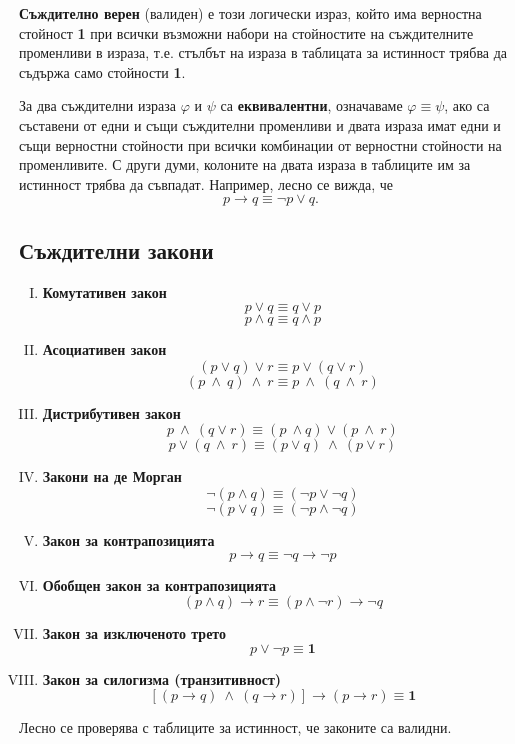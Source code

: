 {\bf Съждително верен} (валиден) е този логически израз, който има верностна стойност {\bf 1} при всички възможни набори на
стойностите на съждителните променливи в израза, т.е. стълбът на израза в таблицата за истинност трябва да съдържа само 
стойности {\bf 1}. 

За два съждителни израза $\varphi$ и $\psi$ са {\bf еквивалентни}, означаваме $\varphi \equiv \psi$, ако са съставени от 
едни и същи съждителни променливи и двата израза имат едни и същи верностни стойности при всички комбинации от верностни 
стойности на променливите. С други думи, колоните на двата израза в таблиците им за истинност трябва да съвпадат.
Например, лесно се вижда, че 
\[p\to q \equiv \neg p \vee q.\]

\subsection*{Съждителни закони}

\begin{enumerate}[I)]
  \item
    {\bf Комутативен закон}
    \[p\vee q \equiv q\vee p\] 
    \[p \wedge q \equiv q \wedge p\]
  \item
    {\bf Асоциативен закон}
    \[(p\vee q)\vee r \equiv p\vee(q\vee r)\]
    \[(p\ \wedge\ q)\ \wedge\ r \equiv p\ \wedge\ (q\ \wedge\ r)\]
  \item
    {\bf Дистрибутивен закон}
    \[p\ \wedge\ (q \vee r) \equiv (p\ \wedge q)\vee (p\ \wedge\ r)\]
    \[p\vee (q\ \wedge\ r) \equiv (p\vee q)\ \wedge\ (p\vee r)\]
  \item
    {\bf Закони на де Морган}
    \[\neg(p \wedge q) \equiv (\neg p \vee \neg q)\]
    \[\neg(p\vee q) \equiv (\neg p \wedge \neg q)\]
  \item
    {\bf Закон за контрапозицията}
    \[p\rightarrow q \equiv \neg q \rightarrow \neg p\]
  \item
    {\bf Обобщен закон за контрапозицията}
    \[(p \wedge q)\rightarrow r \equiv (p \wedge \neg r) \rightarrow \neg q\]
  \item
    {\bf Закон за изключеното трето}
    \[p\vee \neg p \equiv {\mathbf 1}\]
  \item
    {\bf Закон за силогизма (транзитивност)}
    \[[(p\rightarrow q)\ \wedge\ (q\rightarrow r)] \rightarrow (p\rightarrow r) \equiv {\mathbf 1}\]
\end{enumerate}

Лесно се проверява с таблиците за истинност, че законите са валидни.

